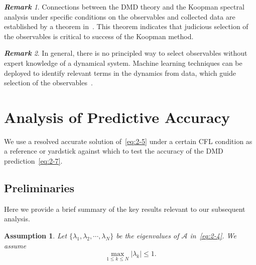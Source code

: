 \documentclass[10pt]{article}
\numberwithin{equation}{section}
\theoremstyle{plain}
\newtheorem{assumption}{\bf Assumption}[section]
\theoremstyle{remark}
\newtheorem{remark}{\bf Remark}[section]
\theoremstyle{remark}
\begin{document}
\begin{remark}
Connections between the DMD theory and the Koopman spectral analysis under specific conditions on the observables and collected data are established by a theorem in~\cite{tu2013dynamic}. This theorem indicates that judicious selection of the observables  is critical to success of the Koopman method.
\end{remark}

\begin{remark}
In general, there is no principled way to select observables without expert knowledge of a dynamical system. Machine learning techniques can be deployed to identify relevant terms in the dynamics from data, which guide selection of the observables~\cite{schmidt2009distilling,wang2011predicting,brunton2016discovering}.
\end{remark}

\section{Analysis of Predictive Accuracy}
\label{sec:acc}
We use a resolved accurate solution of~\cref{eq:2-5} under a certain CFL condition as a reference or yardstick against which to test the accuracy of the DMD prediction~\cref{eq:2-7}. 

\subsection{Preliminaries}
\label{sec:acc_pre}

Here we provide a brief summary of the key results relevant to our subsequent analysis.

\begin{assumption}\label{ass:a3-1}
Let $\{\lambda_1,\lambda_2,\cdots,\lambda_N\}$ be the eigenvalues of $\boldsymbol{\mathcal A}$ in~\cref{eq:2-4}. We assume 
\begin{equation}\label{eq:3-2}
\max_{1\leq k\leq N}|\lambda_k|\leq 1.
\end{equation}
\end{assumption}
\end{document}
